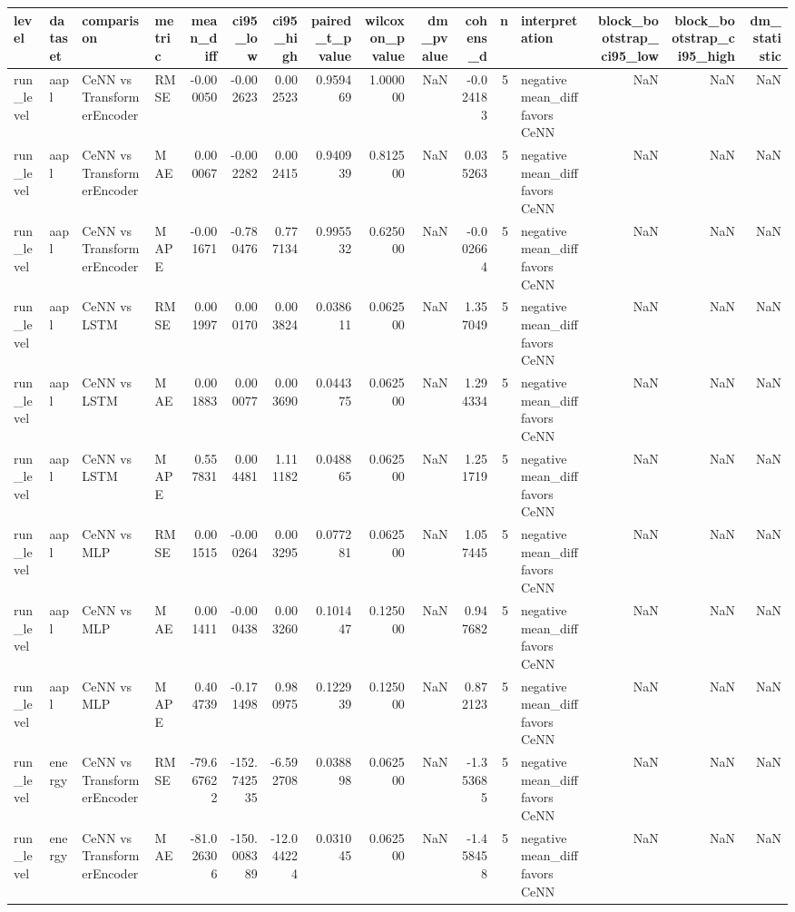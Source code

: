 \begin{tabular}{llllrrrrrrrrlrrr}
\toprule
level & dataset & comparison & metric & mean_diff & ci95_low & ci95_high & paired_t_pvalue & wilcoxon_pvalue & dm_pvalue & cohens_d & n & interpretation & block_bootstrap_ci95_low & block_bootstrap_ci95_high & dm_statistic \\
\midrule
run_level & aapl & CeNN vs TransformerEncoder & RMSE & -0.000050 & -0.002623 & 0.002523 & 0.959469 & 1.000000 & NaN & -0.024183 & 5 & negative mean_diff favors CeNN & NaN & NaN & NaN \\
run_level & aapl & CeNN vs TransformerEncoder & MAE & 0.000067 & -0.002282 & 0.002415 & 0.940939 & 0.812500 & NaN & 0.035263 & 5 & negative mean_diff favors CeNN & NaN & NaN & NaN \\
run_level & aapl & CeNN vs TransformerEncoder & MAPE & -0.001671 & -0.780476 & 0.777134 & 0.995532 & 0.625000 & NaN & -0.002664 & 5 & negative mean_diff favors CeNN & NaN & NaN & NaN \\
run_level & aapl & CeNN vs LSTM & RMSE & 0.001997 & 0.000170 & 0.003824 & 0.038611 & 0.062500 & NaN & 1.357049 & 5 & negative mean_diff favors CeNN & NaN & NaN & NaN \\
run_level & aapl & CeNN vs LSTM & MAE & 0.001883 & 0.000077 & 0.003690 & 0.044375 & 0.062500 & NaN & 1.294334 & 5 & negative mean_diff favors CeNN & NaN & NaN & NaN \\
run_level & aapl & CeNN vs LSTM & MAPE & 0.557831 & 0.004481 & 1.111182 & 0.048865 & 0.062500 & NaN & 1.251719 & 5 & negative mean_diff favors CeNN & NaN & NaN & NaN \\
run_level & aapl & CeNN vs MLP & RMSE & 0.001515 & -0.000264 & 0.003295 & 0.077281 & 0.062500 & NaN & 1.057445 & 5 & negative mean_diff favors CeNN & NaN & NaN & NaN \\
run_level & aapl & CeNN vs MLP & MAE & 0.001411 & -0.000438 & 0.003260 & 0.101447 & 0.125000 & NaN & 0.947682 & 5 & negative mean_diff favors CeNN & NaN & NaN & NaN \\
run_level & aapl & CeNN vs MLP & MAPE & 0.404739 & -0.171498 & 0.980975 & 0.122939 & 0.125000 & NaN & 0.872123 & 5 & negative mean_diff favors CeNN & NaN & NaN & NaN \\
run_level & energy & CeNN vs TransformerEncoder & RMSE & -79.667622 & -152.742535 & -6.592708 & 0.038898 & 0.062500 & NaN & -1.353685 & 5 & negative mean_diff favors CeNN & NaN & NaN & NaN \\
run_level & energy & CeNN vs TransformerEncoder & MAE & -81.026306 & -150.008389 & -12.044224 & 0.031045 & 0.062500 & NaN & -1.458458 & 5 & negative mean_diff favors CeNN & NaN & NaN & NaN \\

\end{tabular}
